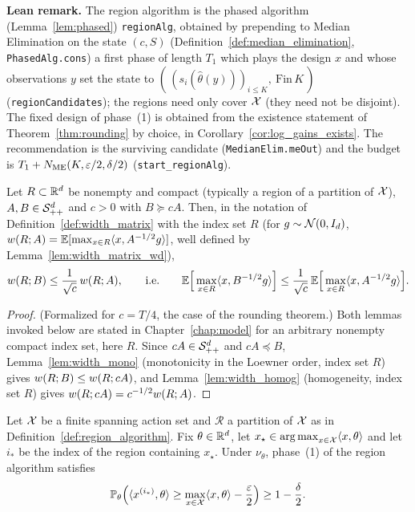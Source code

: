 \textbf{Lean remark.} The region algorithm is the phased algorithm (Lemma~\ref{lem:phased})
\texttt{regionAlg}, obtained by prepending to Median Elimination on the state $(c, S)$
(Definition~\ref{def:median_elimination}, \texttt{PhasedAlg.cons}) a first phase of length $T_1$
which plays the design $x$ and whose observations $y$ set the state to
$(\,(s_i(\hat\theta(y)))_{i \le K},\ \mathrm{Fin}\,K\,)$ (\texttt{regionCandidates}); the regions
need only cover $\mathcal{X}$ (they need not be disjoint). The fixed design of phase~(1) is obtained
from the existence statement of Theorem~\ref{thm:rounding} by choice, in
Corollary~\ref{cor:log_gains_exists}. The recommendation is the surviving candidate
(\texttt{MedianElim.meOut}) and the budget is
$T_1 + N_{\mathrm{ME}}(K,\varepsilon/2,\delta/2)$ (\texttt{start\_regionAlg}).

\begin{lemma}\label{lem:log_gains_region_width_bound}
\leanok
{}
Let $R \subset \mathbb{R}^d$ be nonempty and compact (typically a region of a partition of $\mathcal{X}$),
$A, B \in \mathcal{S}_{++}^{d}$ and $c > 0$ with $B \succeq cA$. Then, in the notation of
Definition~\ref{def:width_matrix} with the index set $R$ (for $g \sim \mathcal{N}(0,I_d)$,
$w(R;A) = \mathbb{E}[\max_{x\in R}\langle x, A^{-1/2}g \rangle]$, well defined by
Lemma~\ref{lem:width_matrix_wd}),
\[
  w(R;B) \le \frac{1}{\sqrt c}\,w(R;A),
  \qquad\text{i.e.}\qquad
  \mathbb{E}\Big[\max_{x\in R}\langle x, B^{-1/2}g \rangle\Big] \le \frac{1}{\sqrt c}\,\mathbb{E}\Big[\max_{x\in R}\langle x, A^{-1/2}g \rangle\Big].
\]
\end{lemma}

\begin{proof}
\leanok
{}
(Formalized for $c = T/4$, the case of the rounding theorem.)
Both lemmas invoked below are stated in Chapter~\ref{chap:model} for an arbitrary nonempty
compact index set, here $R$. Since $cA \in \mathcal{S}_{++}^{d}$ and $cA \preceq B$, Lemma~\ref{lem:width_mono}
(monotonicity in the Loewner order, index set $R$) gives $w(R;B) \le w(R;cA)$,
and Lemma~\ref{lem:width_homog} (homogeneity, index set $R$) gives
$w(R;cA) = c^{-1/2}w(R;A)$.
\end{proof}

\begin{lemma}\label{lem:region_phase1}
\leanok
{}
Let $\mathcal{X}$ be a finite spanning action set and $\mathcal R$ a partition of $\mathcal{X}$ as in
Definition~\ref{def:region_algorithm}.
Fix $\theta \in \mathbb{R}^d$, let $x_\star \in \operatorname*{arg\,max}_{x\in\mathcal{X}}\langle x, \theta \rangle$ and let $i_*$ be
the index of the region containing $x_\star$. Under $\nu_\theta$, phase~(1) of the region
algorithm satisfies
\[
  \mathbb{P}_\theta\Big( \langle x^{(i_*)}, \theta \rangle \ge \max_{x\in\mathcal{X}}\langle x, \theta \rangle - \frac{\varepsilon}2 \Big)
  \ge 1 - \frac\delta2 .
\]
\end{lemma}

